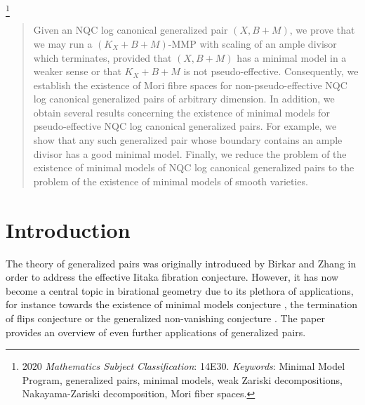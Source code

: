 	\thanks{2020 \emph{Mathematics Subject Classification}: 14E30. \newline
		\indent \emph{Keywords}: Minimal Model Program, generalized pairs, minimal models, weak Zariski decompositions, Nakayama-Zariski decomposition, Mori fiber spaces.
	}
	
	\begin{abstract}
		Given an NQC log canonical generalized pair $(X,B+M)$, we prove that we may run a $(K_X+B+M)$-MMP with scaling of an ample divisor which terminates, provided that $(X,B+M)$ has a minimal model in a weaker sense or that $K_X+B+M$ is not pseudo-effective. Consequently, we establish the existence of Mori fibre spaces for non-pseudo-effective NQC log canonical generalized pairs of arbitrary dimension. In addition, we obtain several results concerning the existence of minimal models for pseudo-effective NQC log canonical generalized pairs. For example, we show that any such generalized pair whose boundary contains an ample divisor has a good minimal model. Finally, we reduce the problem of the existence of minimal models of NQC log canonical generalized pairs to the problem of the existence of minimal models of smooth varieties.
	\end{abstract}
	
	\maketitle
	
	\begingroup
	\hypersetup{linkcolor=black}
	\setcounter{tocdepth}{1}
	\tableofcontents
	\endgroup
	
	
	
	
	\section{Introduction}
	
	The theory of generalized pairs was originally introduced by Birkar and Zhang \cite{BZ16} in order to address the effective Iitaka fibration conjecture. However, it has now become a central topic in birational geometry due to its plethora of applications, for instance towards the existence of minimal models conjecture \cite{LT22a,LT22b,LX22a,LX22b}, the termination of flips conjecture \cite{HM20,CT20} or the generalized non-vanishing conjecture \cite{HanLiu20,Hash22b,LMPTX22}. The paper \cite{Bir21c} provides an overview of even further applications of generalized pairs.
	

